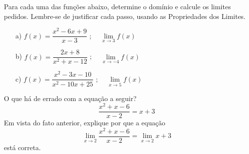 
\question [] %

Para cada uma das funções abaixo, determine o domínio e calcule os limites pedidos. Lembre-se de justificar cada passo, usando as Propriedades dos Limites.

\begin{multicols}{2}
  \begin{itemize}
    \item[a)] $f(x) = \dfrac{x^2 - 6x + 9}{x-3}$ ; \ \ $\lim\limits_{x\rightarrow 3}f(x)$
      \vspace{0.3cm}
    \item[b)] $f(x) = \dfrac{2x+8}{x^2 + x - 12}$ ; \ \ $\lim\limits_{x\rightarrow -4}f(x)$
      \vspace{0.3cm}
    \item[c)] $f(x) = \dfrac{x^2 - 3x - 10}{x^2 - 10x + 25}$ ; \ \ $\lim\limits_{x\rightarrow 5}f(x)$
      \vspace{0.3cm}
  \end{itemize}
\end{multicols}

\question [] %
O que há de errado com a equação a seguir?
$$\dfrac{x^2 + x - 6}{x-2} = x+3$$
Em vista do fato anterior, explique por que a equação
$$\lim\limits_{x\rightarrow 2}\dfrac{x^2 + x - 6}{x-2} = \lim\limits_{x\rightarrow 2}x+3$$
está correta.

